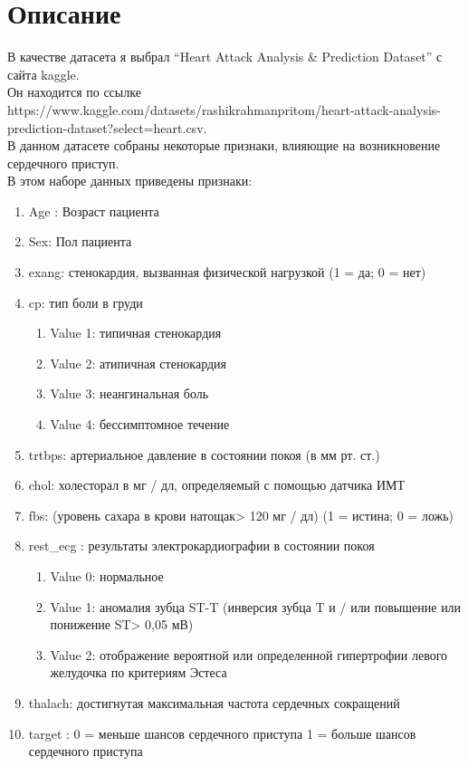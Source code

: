 \section{Описание}

В качестве датасета я выбрал \enquote{Heart Attack Analysis \& Prediction Dataset} с сайта kaggle.\\
Он находится по ссылке https://www.kaggle.com/datasets/rashikrahmanpritom/heart-attack-analysis-prediction-dataset?select=heart.csv. \\В данном датасете собраны некоторые признаки, влияющие на возникновение сердечного приступ.\\

В этом наборе данных приведены признаки:\\

\begin{enumerate}
 \item Age : Возраст пациента
 \item Sex: Пол пациента
 \item exang: стенокардия, вызванная физической нагрузкой (1 = да; 0 = нет)
 \item cp: тип боли в груди
	\begin{enumerate}
	 \item Value 1: типичная стенокардия
	 \item Value 2: атипичная стенокардия
	 \item Value 3: неангинальная боль
	 \item Value 4: бессимптомное течение
	\end{enumerate}
 \item trtbps: артериальное давление в состоянии покоя (в мм рт. ст.)
 \item chol: холесторал в мг / дл, определяемый с помощью датчика ИМТ
 \item fbs: (уровень сахара в крови натощак> 120 мг / дл) (1 = истина; 0 = ложь)
 \item rest\_ecg : результаты электрокардиографии в состоянии покоя
	\begin{enumerate}
	 \item Value 0: нормальное
	 \item Value 1: аномалия зубца ST-T (инверсия зубца T и / или повышение или понижение ST> 0,05 мВ)
  	 \item Value 2: отображение вероятной или определенной гипертрофии левого желудочка по критериям Эстеса
	\end{enumerate}
 \item thalach: достигнутая максимальная частота сердечных сокращений
 \item target : 0 = меньше шансов сердечного приступа 1 = больше шансов сердечного приступа
\end{enumerate}


